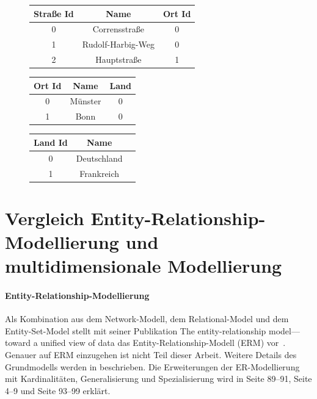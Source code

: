 \documentclass[
  language=german, %
  type=bachelor%
]{isthesis}
\begin{document}
\begin{content}
  \begin{figure}[caption={Beispiel der Dimensionstabellen \textit{Ort} im Snowflake-Schema}, label={table:dimension-table-snow}]
    \footnotesize
    \begin{tabular}{c c c }
      Straße Id & Name & Ort Id \\
      \toprule
      0 & Corrensstraße & 0 \\
      1 & Rudolf-Harbig-Weg & 0 \\
      2 & Hauptstraße & 1 \\
    \end{tabular}
    \begin{tabular}{c c c}
      Ort Id & Name & Land \\
      \toprule
      0 & Münster & 0 \\
      1 & Bonn & 0 \\
    \end{tabular}
    \begin{tabular}{c c c }
      Land Id & Name \\
      \toprule
      0 & Deutschland \\
      1 & Frankreich \\
    \end{tabular}
  \end{figure}

  \section{Vergleich Entity-Relationship-Modellierung und multidimensionale Modellierung}

  \paragraph{Entity-Relationship-Modellierung} Als Kombination aus dem
  Network-Modell, dem Relational-Model und dem Entity-Set-Model stellt
  \citeauthor{chen1976entity} \citeyear{chen1976entity} mit seiner Publikation
  \glqq{}The entity-relationship model—toward a unified view of data\grqq{} das
  Entity-Relationship-Modell (ERM) vor~\cite[][S. 2]{chen1976entity}.  Genauer
  auf \acrshort{ERM} einzugehen ist nicht Teil dieser Arbeit. Weitere Details
  des Grundmodells werden in \textsc{\cite{chen1976entity}} beschrieben. Die
  Erweiterungen der ER-Modellierung mit Kardinalitäten, Generalisierung und
  Spezialisierung wird in \textsc{\cite{becker2004handelsinformationssysteme}}
  Seite 89--91, \textsc{\cite{becker2012grundsatze}} Seite 4--9 und
  \textsc{\cite{schutte2013grundsatze}} Seite 93--99 erklärt.


\end{content}
\end{document}

